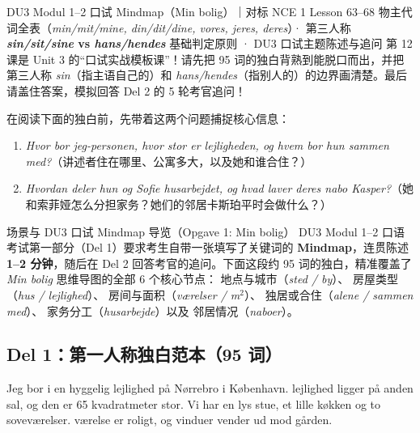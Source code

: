 {DU3 Modul 1--2 口试 Mindmap（Min bolig）｜对标 NCE 1 Lesson 63--68}
{物主代词全表（\textit{min/mit/mine, din/dit/dine, vores, jeres, deres}）· 第三人称 \textbf{\textit{sin/sit/sine} vs \textit{hans/hendes}} 基础判定原则 · DU3 口试主题陈述与追问}
{第 12 课是 Unit 3 的“口试实战模板课”！请先把 95 词的独白背熟到能脱口而出，并把第三人称 \textit{sin}（指主语自己的）和 \textit{hans/hendes}（指别人的）的边界画清楚。最后请盖住答案，模拟回答 Del 2 的 5 轮考官追问！}

\begin{foerduleaeser}
在阅读下面的独白前，先带着这两个问题捕捉核心信息：
\begin{enumerate}
  \item \textit{Hvor bor jeg-personen, hvor stor er lejligheden, og hvem bor hun sammen med?}（讲述者住在哪里、公寓多大，以及她和谁合住？）
  \item \textit{Hvordan deler hun og Sofie husarbejdet, og hvad laver deres nabo Kasper?}（她和索菲娅怎么分担家务？她们的邻居卡斯珀平时会做什么？）
\end{enumerate}
\end{foerduleaeser}


\begin{tipbox}{场景与 DU3 口试 Mindmap 导览（Opgave 1: Min bolig）}
DU3 Modul 1--2 口语考试第一部分（Del 1）要求考生自带一张填写了关键词的 \textbf{Mindmap}，连贯陈述 \textbf{1--2 分钟}，随后在 Del 2 回答考官的追问。下面这段约 95 词的独白，精准覆盖了 \textit{Min bolig} 思维导图的全部 6 个核心节点： 地点与城市（\textit{sted / by}）、 房屋类型（\textit{hus / lejlighed}）、 房间与面积（\textit{værelser / m$^2$}）、 独居或合住（\textit{alene / sammen med}）、 家务分工（\textit{husarbejde}）以及  邻居情况（\textit{naboer}）。
\end{tipbox}

\subsection*{Del 1：第一人称独白范本（95 词）}

Jeg bor i en hyggelig lejlighed på Nørrebro i København.  lejlighed ligger på anden sal, og den er 65 kvadratmeter stor. Vi har en lys stue, et lille køkken og to soveværelser.  værelse er roligt, og  vinduer vender ud mod gården.

